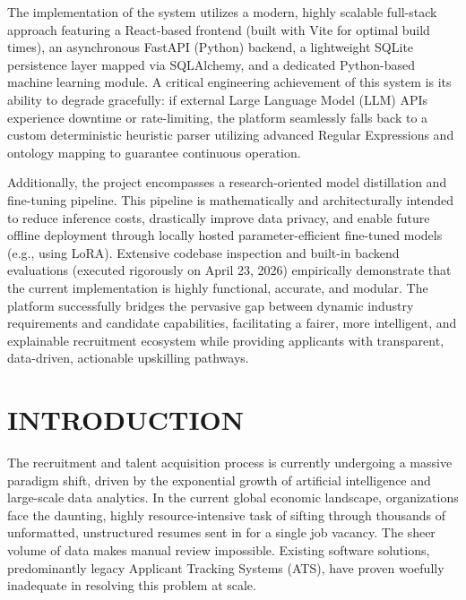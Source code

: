 \documentclass[12pt,a4paper]{report}
\begin{document}
The implementation of the system utilizes a modern, highly scalable full-stack approach featuring a React-based frontend (built with Vite for optimal build times), an asynchronous FastAPI (Python) backend, a lightweight SQLite persistence layer mapped via SQLAlchemy, and a dedicated Python-based machine learning module. A critical engineering achievement of this system is its ability to degrade gracefully: if external Large Language Model (LLM) APIs experience downtime or rate-limiting, the platform seamlessly falls back to a custom deterministic heuristic parser utilizing advanced Regular Expressions and ontology mapping to guarantee continuous operation. 

Additionally, the project encompasses a research-oriented model distillation and fine-tuning pipeline. This pipeline is mathematically and architecturally intended to reduce inference costs, drastically improve data privacy, and enable future offline deployment through locally hosted parameter-efficient fine-tuned models (e.g., using LoRA). Extensive codebase inspection and built-in backend evaluations (executed rigorously on April 23, 2026) empirically demonstrate that the current implementation is highly functional, accurate, and modular. The platform successfully bridges the pervasive gap between dynamic industry requirements and candidate capabilities, facilitating a fairer, more intelligent, and explainable recruitment ecosystem while providing applicants with transparent, data-driven, actionable upskilling pathways.

\tableofcontents

\chapter{INTRODUCTION}

The recruitment and talent acquisition process is currently undergoing a massive paradigm shift, driven by the exponential growth of artificial intelligence and large-scale data analytics. In the current global economic landscape, organizations face the daunting, highly resource-intensive task of sifting through thousands of unformatted, unstructured resumes sent in for a single job vacancy. The sheer volume of data makes manual review impossible. Existing software solutions, predominantly legacy Applicant Tracking Systems (ATS), have proven woefully inadequate in resolving this problem at scale. 
\end{document}
